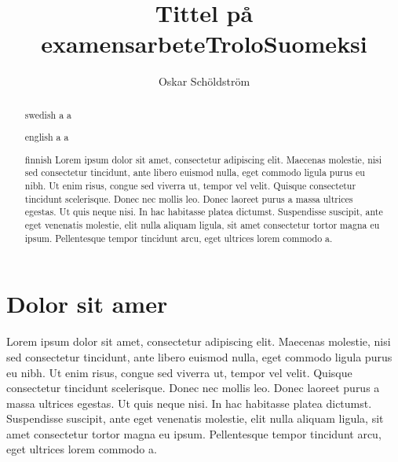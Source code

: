 \documentclass[twoside,emptyfirstpagenumber,swedish]{../thesis}
\begin{document}
\title{Tittel på examensarbete}
\author{Oskar Schöldström}
\date{\the\year}


\maketitle

\begin{abstract}{swedish}
a  a \\
\end{abstract}

\title{Trolo}
\begin{abstract}{english}
a  a \\
\end{abstract}

\title{Suomeksi}
\begin{abstract}{finnish}
Lorem ipsum dolor sit amet, consectetur adipiscing elit. Maecenas molestie, nisi sed consectetur tincidunt, ante libero euismod nulla, eget commodo ligula purus eu nibh. Ut enim risus, congue sed viverra ut, tempor vel velit. Quisque consectetur tincidunt scelerisque. Donec nec mollis leo. Donec laoreet purus a massa ultrices egestas. Ut quis neque nisi. In hac habitasse platea dictumst. Suspendisse suscipit, ante eget venenatis molestie, elit nulla aliquam ligula, sit amet consectetur tortor magna eu ipsum. Pellentesque tempor tincidunt arcu, eget ultrices lorem commodo a.
\end{abstract}

\section{Dolor sit amer}

Lorem ipsum dolor sit amet, consectetur adipiscing elit. Maecenas molestie, nisi sed consectetur tincidunt, ante libero euismod nulla, eget commodo ligula purus eu nibh. Ut enim risus, congue sed viverra ut, tempor vel velit. Quisque consectetur tincidunt scelerisque. Donec nec mollis leo. Donec laoreet purus a massa ultrices egestas. Ut quis neque nisi. In hac habitasse platea dictumst. Suspendisse suscipit, ante eget venenatis molestie, elit nulla aliquam ligula, sit amet consectetur tortor magna eu ipsum. Pellentesque tempor tincidunt arcu, eget ultrices lorem commodo a.
\end{document}
